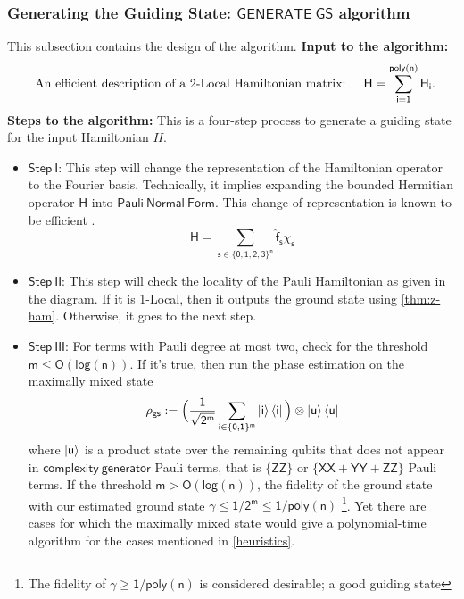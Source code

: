 \documentclass[11pt]{article}
\begin{document}
\subsubsection{Generating the Guiding State: $\mathsf{GENERATE\ GS}$ algorithm }\label{subsec:patent-2}
This subsection contains the design of the algorithm. \newline
\textbf{Input to the algorithm:}
\begin{equation*}
\begin{array}{ll@{}ll}
\text{An efficient description of a $2$-Local Hamiltonian matrix: }  &\displaystyle  \mathsf{H=\sum_{i=1}^{poly(n)}H_i}.
\end{array}
\end{equation*}
\textbf{Steps to the algorithm:}
This is a four-step process to generate a guiding state for the input Hamiltonian $H$.
\begin{itemize}
    \item $\mathsf{Step\ I}$: This step will change the representation of the Hamiltonian operator to the Fourier basis. Technically, it implies expanding the bounded Hermitian operator $\mathsf{H}$ into $\mathsf{Pauli\ Normal\ Form}$. This change of representation is known to be efficient \cite{cubitt2016complexity}.
    \begin{equation}\label{eqn:operator-fourier-trans}
        \mathsf{H=\sum_{s\in \{0,1,2,3\}^n} \hat{f}_s\chi_s}
    \end{equation}
    \item $\mathsf{Step\ II}$: This step will check the locality of the Pauli Hamiltonian as given in the diagram. If it is 1-Local, then it outputs the ground state using \ref{thm:z-ham}. Otherwise, it goes to the next step.
    \item $\mathsf{Step\ III}$: For terms with Pauli degree at most two, check for the threshold $\mathsf{m\leq O(log(n))}$. If it's true, then run the phase estimation on the maximally mixed state  
    \begin{equation}\label{eqn:maximally-mixed-state}
        \mathsf{\rho_{gs}:= \Big( \frac{1}{\sqrt{2^{m}}}\sum_{i\in \{0,1\}^m}\ket{i}\bra{i}\Big)\otimes \ket{u}\bra{u} }
    \end{equation}
    where $\mathsf{\ket{u}}$ is a product state over the remaining qubits that does not appear in $\mathsf{complexity\ generator}$ Pauli terms, that is $\mathsf{\{ZZ\}}$ or $\mathsf{\{XX+YY+ZZ\}}$ Pauli terms. If the threshold $\mathsf{m>O(log(n))}$, the fidelity of the ground state with our estimated ground state $\mathsf{\gamma \leq 1/2^m \leq 1/poly(n)}$ \footnote{The fidelity of $\mathsf{\gamma \geq 1/poly(n)}$ is considered desirable; a good guiding state}. Yet there are cases for which the maximally mixed state would give a polynomial-time algorithm for the cases mentioned in \ref{heuristics}.
\end{itemize}
\end{document}
